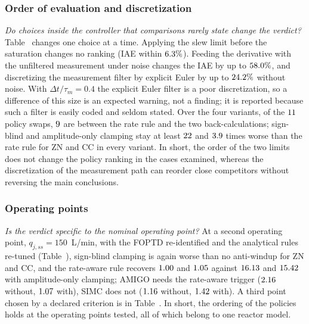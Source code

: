 \subsubsection{Order of evaluation and discretization}
\label{subsubsec:order}
\emph{Do choices inside the controller that comparisons rarely state change the verdict?} Table~ changes one choice at a time. Applying the slew limit before the saturation changes no ranking (IAE within $6.3\%$). Feeding the derivative with the unfiltered measurement under noise changes the IAE by up to $58.0\%$, and discretizing the measurement filter by explicit Euler by up to $24.2\%$ without noise. With $\Delta t/\tau_m = 0.4$ the explicit Euler filter is a poor discretization, so a difference of this size is an expected warning, not a finding; it is reported because such a filter is easily coded and seldom stated. Over the four variants, of the $11$ policy swaps, $9$ are between the rate rule and the two back-calculations; sign-blind and amplitude-only clamping stay at least $22$ and $3.9$ times worse than the rate rule for ZN and CC in every variant. In short, the order of the two limits does not change the policy ranking in the cases examined, whereas the discretization of the measurement path can reorder close competitors without reversing the main conclusions.

\subsubsection{Operating points}
\label{subsubsec:op_points}
\emph{Is the verdict specific to the nominal operating point?} At a second operating point, $q_{j,ss} = 150$~L/min, with the FOPTD re-identified and the analytical rules re-tuned (Table~), sign-blind clamping is again worse than no anti-windup for ZN and CC, and the rate-aware rule recovers $1.00$ and $1.05$ against $16.13$ and $15.42$ with amplitude-only clamping; AMIGO needs the rate-aware trigger ($2.16$ without, $1.07$ with), SIMC does not ($1.16$ without, $1.42$ with). A third point chosen by a declared criterion is in Table~. In short, the ordering of the policies holds at the operating points tested, all of which belong to one reactor model.



